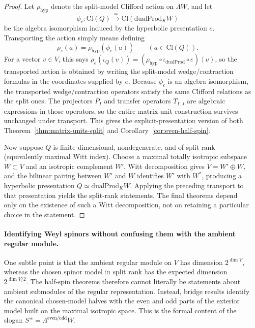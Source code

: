 \documentclass{birkjour}
\theoremstyle{plain}
\theoremstyle{definition}
\theoremstyle{remark}
\newcommand{\Cl}{\mathrm{Cl}}
\newcommand{\dualProd}{\mathrm{dualProd}}
\newcommand{\wedgeW}{\Lambda W}
\begin{document}
\begin{proof}
Let $\rho_{\mathrm{hyp}}$ denote the split-model Clifford action on
$\wedgeW$, and let
\[
  \phi_e:\Cl(Q)\xrightarrow{\ \simeq\ }\Cl(\dualProd_K W)
\]
be the algebra isomorphism induced by the hyperbolic presentation $e$.
Transporting the action simply means defining
\[
  \rho_e(a)=\rho_{\mathrm{hyp}}(\phi_e(a))
  \qquad (a\in \Cl(Q)).
\]
For a vector $v\in V$, this says
\(\rho_e(\iota_Q(v)) = (\rho_{\mathrm{hyp}}\circ \iota_{\dualProd}\circ e)(v)\),
so the transported action is obtained by writing the split-model
wedge/contraction formulas in the coordinates supplied by $e$.
Because $\phi_e$ is an algebra isomorphism, the transported wedge/contraction
operators satisfy the same Clifford relations as the split ones. The
projectors $P_I$ and transfer operators $T_{I,J}$ are algebraic expressions in
those operators, so the entire matrix-unit construction survives unchanged
under transport. This gives the explicit-presentation version of both
Theorem~{}\ref{thm:matrix-units-split} and
Corollary~{}\ref{cor:even-half-spin}.

Now suppose $Q$ is finite-dimensional, nondegenerate, and of split rank
(equivalently maximal Witt index). Choose a maximal totally isotropic subspace $W\subset V$ and an
isotropic complement $W'$. Witt decomposition gives
$V=W'\oplus W$, and the bilinear pairing between $W'$ and $W$ identifies
$W'$ with $W^*$, producing a hyperbolic presentation
$Q\simeq \dualProd_K W$. Applying the preceding transport to that presentation
yields the split-rank statements. The final theorems depend only on the
existence of such a Witt decomposition, not on retaining a particular choice in
the statement.
\end{proof}

\paragraph{Identifying Weyl spinors without confusing them with the ambient
regular module.}
One subtle point is that the ambient regular module on $V$ has dimension
$2^{\dim V}$, whereas the chosen spinor model in split rank has the expected
dimension $2^{\dim V/2}$. The half-spin theorems therefore cannot literally be
statements about ambient submodules of the regular representation. Instead,
bridge results identify the canonical chosen-model halves with the even and odd
parts of the exterior model built on the maximal isotropic space. This is the
formal content of the slogan
$S^{\pm} = \Lambda^{\mathrm{even}/\mathrm{odd}} W$.
\end{document}
